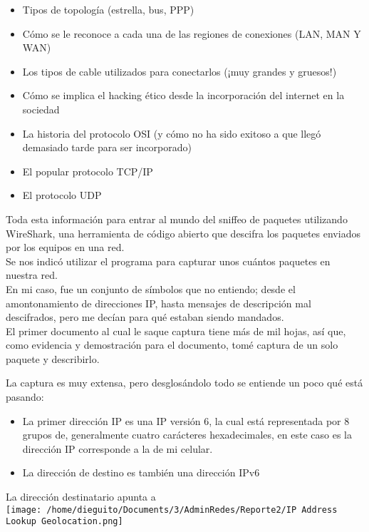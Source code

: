 \documentclass[]{article}
\begin{document}
\begin{itemize}
	\item Tipos de topología (estrella, bus, PPP)
	\item Cómo se le reconoce a cada una de
	las regiones de conexiones (LAN, MAN Y WAN)
	\item Los tipos de cable utilizados para
	conectarlos (¡muy grandes y gruesos!)
	\item Cómo se implica el hacking ético
	desde la incorporación del internet en la
	sociedad
	\item La historia del protocolo OSI (y cómo
	no ha sido exitoso a que llegó demasiado
	tarde para ser incorporado)
	\item El popular protocolo TCP/IP
	\item El protocolo UDP
\end{itemize}

Toda esta información para entrar al mundo
del sniffeo de paquetes utilizando WireShark, una herramienta de código abierto que descifra los paquetes enviados por  los
equipos en una red.\\
Se nos indicó utilizar el programa para
capturar unos cuántos paquetes en nuestra
red.\\
En mi caso, fue un conjunto de símbolos que
no entiendo; desde el amontonamiento de
direcciones IP, hasta mensajes de
descripción mal descifrados, pero me decían
para qué estaban siendo mandados.\\
El primer documento al cual le saque captura
tiene más de mil hojas, así que, como
evidencia y demostración para el documento,
tomé captura de un solo paquete y
describirlo.


La captura es muy extensa, pero desglosándolo todo se entiende un poco qué está pasando:

\begin{itemize}
	\item La primer dirección IP es una IP versión
	6, la cual está representada por 8 grupos de, generalmente cuatro carácteres hexadecimales, en este caso es la dirección
	IP corresponde a la de mi celular.
	\item La dirección de destino es también una
	dirección IPv6
\end{itemize}
La dirección destinatario apunta a\\

\texttt{[image: /home/dieguito/Documents/3/AdminRedes/Reporte2/IP Address Lookup Geolocation.png]}\\
\end{document}
